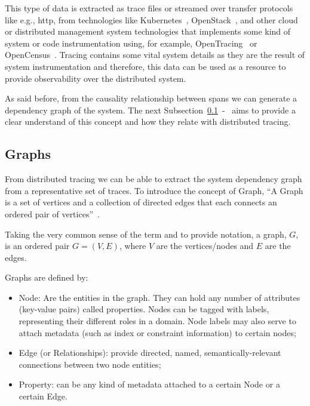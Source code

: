 This type of data is extracted as trace files or streamed over transfer protocols like e.g., \gls{http}, from technologies like Kubernetes~\cite{what_is_kubernetes}, OpenStack~\cite{what_is_opensatck}, and other cloud or distributed management system technologies that implements some kind of system or code instrumentation using, for example, OpenTracing~\cite{what_is_opentracing} or OpenCensus~\cite{what_is_opencensus}. Tracing contains some vital system details as they are the result of system instrumentation and therefore, this data can be used as a resource to provide observability over the distributed system.

As said before, from the causality relationship between spans we can generate a dependency graph of the system. The next Subsection~\ref{subsec:graphs}~-~ aims to provide a clear understand of this concept and how they relate with distributed tracing.

\subsection{Graphs}
\label{subsec:graphs}

From distributed tracing we can be able to extract the system dependency graph from a representative set of traces. To introduce the concept of Graph, ``A Graph is a set of vertices and a collection of directed edges that each connects an ordered pair of vertices''~\cite{graph_standard_definition}.

Taking the very common sense of the term and to provide notation, a graph, $G$, is an ordered pair $G = (V, E)$, where $V$ are the vertices/nodes and $E$ are the edges.

Graphs are defined by:

\begin{itemize}
    \item Node: Are the entities in the graph. They can hold any number of attributes (key-value pairs) called properties. Nodes can be tagged with labels, representing their different roles in a domain. Node labels may also serve to attach metadata (such as index or constraint information) to certain nodes;
    \item Edge (or Relationships): provide directed, named, semantically-relevant connections between two node entities;
    \item Property: can be any kind of metadata attached to a certain Node or a certain Edge.
\end{itemize}

